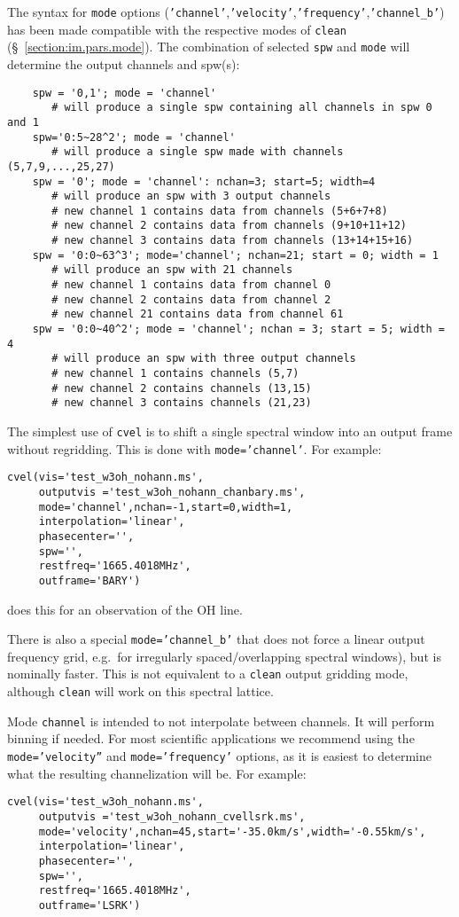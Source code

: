 {The syntax for {\tt mode} options 
({\tt 'channel'},{\tt 'velocity'},{\tt 'frequency'},{\tt 'channel\_b'})
has been made compatible with the
respective modes of {\tt clean} (\S~\ref{section:im.pars.mode}).  The
combination of selected {\tt spw} and {\tt mode} will determine the
output channels and spw(s):
\small
\begin{verbatim}
    spw = '0,1'; mode = 'channel'
       # will produce a single spw containing all channels in spw 0 and 1
    spw='0:5~28^2'; mode = 'channel'
       # will produce a single spw made with channels (5,7,9,...,25,27)
    spw = '0'; mode = 'channel': nchan=3; start=5; width=4
       # will produce an spw with 3 output channels
       # new channel 1 contains data from channels (5+6+7+8)
       # new channel 2 contains data from channels (9+10+11+12)
       # new channel 3 contains data from channels (13+14+15+16)
    spw = '0:0~63^3'; mode='channel'; nchan=21; start = 0; width = 1
       # will produce an spw with 21 channels
       # new channel 1 contains data from channel 0
       # new channel 2 contains data from channel 2
       # new channel 21 contains data from channel 61
    spw = '0:0~40^2'; mode = 'channel'; nchan = 3; start = 5; width = 4
       # will produce an spw with three output channels
       # new channel 1 contains channels (5,7)
       # new channel 2 contains channels (13,15)
       # new channel 3 contains channels (21,23)
\end{verbatim}
\normalsize

The simplest use of {\tt cvel} is to shift a single spectral window
into an output frame without regridding.  This is done with 
{\tt mode='channel'}.  For example:
\small
\begin{verbatim}
cvel(vis='test_w3oh_nohann.ms',
     outputvis ='test_w3oh_nohann_chanbary.ms',
     mode='channel',nchan=-1,start=0,width=1,
     interpolation='linear',
     phasecenter='',
     spw='',
     restfreq='1665.4018MHz',
     outframe='BARY')
\end{verbatim}
\normalsize
does this for an observation of the OH line.

There is also a special {\tt mode='channel\_b'} that does not force a
linear output frequency grid, e.g.\ for irregularly spaced/overlapping
spectral windows), but is nominally faster.  This is not equivalent to
a {\tt clean} output gridding mode, although {\tt clean} will
work on this spectral lattice.

Mode {\tt channel} is intended to not interpolate between channels. It
will perform binning if needed.  For most scientific applications we
recommend using the {\tt mode='velocity''} and {\tt mode='frequency'}
options, as it is easiest to determine what the resulting
channelization will be. For example: \small
\begin{verbatim}
cvel(vis='test_w3oh_nohann.ms',
     outputvis ='test_w3oh_nohann_cvellsrk.ms',
     mode='velocity',nchan=45,start='-35.0km/s',width='-0.55km/s',
     interpolation='linear',
     phasecenter='',
     spw='',
     restfreq='1665.4018MHz',
     outframe='LSRK')


\end{verbatim}}
